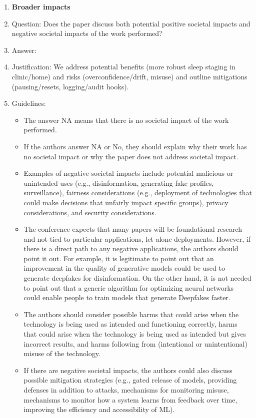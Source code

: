 \documentclass{article}
\begin{document}
\begin{enumerate}
\item {\bf Broader impacts}
    \item[] Question: Does the paper discuss both potential positive societal impacts and negative societal impacts of the work performed?
    \item[] Answer: \answerYes{}
    \item[] Justification: We address potential benefits (more robust sleep staging in clinic/home) and risks (overconfidence/drift, misuse) and outline mitigations (pausing/resets, logging/audit hooks).
    \item[] Guidelines:
    \begin{itemize}
        \item The answer NA means that there is no societal impact of the work performed.
        \item If the authors answer NA or No, they should explain why their work has no societal impact or why the paper does not address societal impact.
        \item Examples of negative societal impacts include potential malicious or unintended uses (e.g., disinformation, generating fake profiles, surveillance), fairness considerations (e.g., deployment of technologies that could make decisions that unfairly impact specific groups), privacy considerations, and security considerations.
        \item The conference expects that many papers will be foundational research and not tied to particular applications, let alone deployments. However, if there is a direct path to any negative applications, the authors should point it out. For example, it is legitimate to point out that an improvement in the quality of generative models could be used to generate deepfakes for disinformation. On the other hand, it is not needed to point out that a generic algorithm for optimizing neural networks could enable people to train models that generate Deepfakes faster.
        \item The authors should consider possible harms that could arise when the technology is being used as intended and functioning correctly, harms that could arise when the technology is being used as intended but gives incorrect results, and harms following from (intentional or unintentional) misuse of the technology.
        \item If there are negative societal impacts, the authors could also discuss possible mitigation strategies (e.g., gated release of models, providing defenses in addition to attacks, mechanisms for monitoring misuse, mechanisms to monitor how a system learns from feedback over time, improving the efficiency and accessibility of ML).
    \end{itemize}
    

\end{enumerate}
\end{document}
